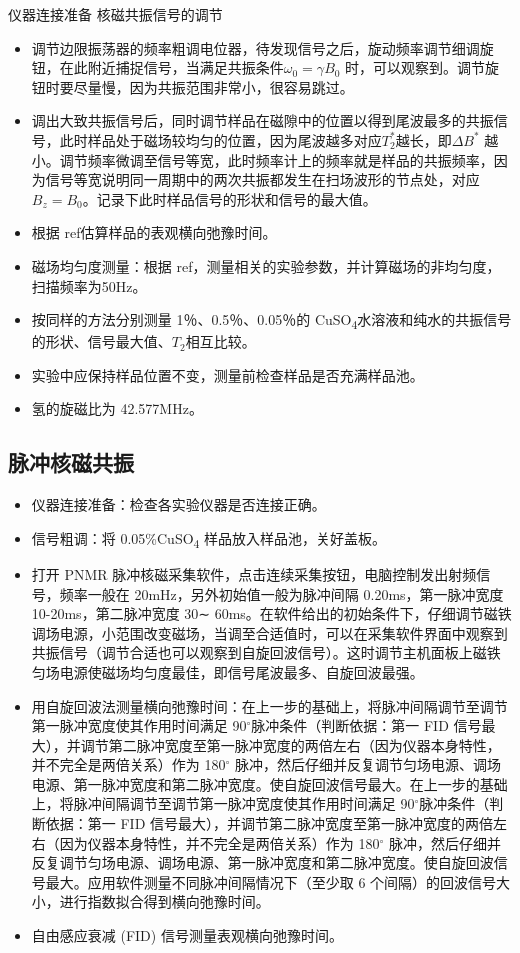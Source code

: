 仪器连接准备
核磁共振信号的调节
\begin{itemize}
\item
  调节边限振荡器的频率粗调电位器，待发现信号之后，旋动频率调节细调旋钮，在此附近捕捉信号，当满足共振条件$\omega_0=\gamma B_0$
时，可以观察到。调节旋钮时要尽量慢，因为共振范围非常小，很容易跳过。
\item
  调出大致共振信号后，同时调节样品在磁隙中的位置以得到尾波最多的共振信号，此时样品处于磁场较均匀的位置，因为尾波越多对应$T_2^{*}$越长，即$\Delta B^{*}$  越小。调节频率微调至信号等宽，此时频率计上的频率就是样品的共振频率，因为信号等宽说明同一周期中的两次共振都发生在扫场波形的节点处，对应$B_z = B_0$。记录下此时样品信号的形状和信号的最大值。
\item
  根据{\color{red} ref}估算样品的表观横向弛豫时间。
\item
  磁场均匀度测量：根据{\color{red} ref}，测量相关的实验参数，并计算磁场的非均匀度，扫描频率为50Hz。
\item
  按同样的方法分别测量 1％、0.5％、0.05％的 CuSO\textsubscript{4}水溶液和纯水的共振信号的形状、信号最大值、$T_2$相互比较。
\item
  实验中应保持样品位置不变，测量前检查样品是否充满样品池。
\item
  氢的旋磁比为 42.577MHz。
\end{itemize}

\subsection{脉冲核磁共振}\label{ux8109ux51b2ux6838ux78c1ux5171ux632f}

\begin{itemize}
\item
  仪器连接准备：检查各实验仪器是否连接正确。
\item
  信号粗调：将 0.05\%CuSO\textsubscript{4} 样品放入样品池，关好盖板。
\item
  打开 PNMR 脉冲核磁采集软件，点击连续采集按钮，电脑控制发出射频信号，频率一般在
  20mHz，另外初始值一般为脉冲间隔 0.20ms，第一脉冲宽度
  10-20ms，第二脉冲宽度 30∼
  60ms。在软件给出的初始条件下，仔细调节磁铁调场电源，小范围改变磁场，当调至合适值时，可以在采集软件界面中观察到共振信号（调节合适也可以观察到自旋回波信号）。这时调节主机面板上磁铁匀场电源使磁场均匀度最佳，即信号尾波最多、自旋回波最强。
\item
  用自旋回波法测量横向弛豫时间：在上一步的基础上，将脉冲间隔调节至调节第一脉冲宽度使其作用时间满足
  90$^{\circ}$脉冲条件（判断依据：第一 FID
  信号最大），并调节第二脉冲宽度至第一脉冲宽度的两倍左右（因为仪器本身特性，并不完全是两倍关系）作为
  180$^{\circ}$
  脉冲，然后仔细并反复调节匀场电源、调场电源、第一脉冲宽度和第二脉冲宽度。使自旋回波信号最大。在上一步的基础上，将脉冲间隔调节至调节第一脉冲宽度使其作用时间满足
  90$^{\circ}$脉冲条件（判断依据：第一 FID
  信号最大），并调节第二脉冲宽度至第一脉冲宽度的两倍左右（因为仪器本身特性，并不完全是两倍关系）作为
  180$^{\circ}$
  脉冲，然后仔细并反复调节匀场电源、调场电源、第一脉冲宽度和第二脉冲宽度。使自旋回波信号最大。应用软件测量不同脉冲间隔情况下（至少取
  6 个间隔）的回波信号大小，进行指数拟合得到横向弛豫时间。
\item
  自由感应衰减 (FID) 信号测量表观横向弛豫时间。
\end{itemize}

